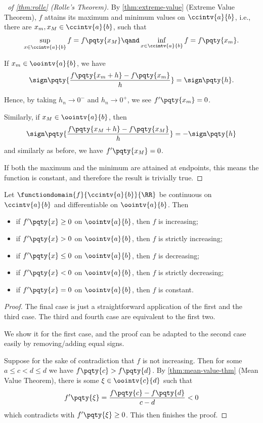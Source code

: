 \begin{proof}[\proofname\ of \autoref{thm:rolle} (Rolle's Theorem)]
    By \autoref{thm:extreme-value} (Extreme Value Theorem), \(f\) attains its maximum and minimum values on \(\ccintv{a}{b}\), i.e., there are \(x_m, x_M \in \ccintv{a}{b}\), such that
    \[
        \sup_{x \in \ccintv{a}{b}} f = f\pqty{x_M} \qand \inf_{x \in \ccintv{a}{b}} f = f\pqty{x_m}.
    \]

    If \(x_m \in \oointv{a}{b}\), we have
    \[
        \sign \pqty{\frac{f\pqty{x_m + h} - f\pqty{x_m}}{{h}}} = \sign \pqty{h}.
    \]

    Hence, by taking \(h_n \to 0^-\) and \(h_n \to 0^+\), we see \(f'\pqty{x_m} = 0\).

    Similarly, if \(x_M \in \oointv{a}{b}\), then
    \[
        \sign \pqty{\frac{f\pqty{x_M + h} - f\pqty{x_M}}{h}} = - \sign\pqty{h}
    \]
    and similarly as before, we have \(f'\pqty{x_M} = 0\).

    If both the maximum and the minimum are attained at endpoints, this means the function is constant, and therefore the result is trivially true.
\end{proof}

\begin{corollary}
    \label{cor:sign-of-derivative-monotonicity}%
    Let \(\functiondomain{f}{\ccintv{a}{b}}{\RR}\) be continuous on \(\ccintv{a}{b}\) and differentiable on \(\oointv{a}{b}\). Then
    \begin{itemize}
        \item if \(f'\pqty{x} \geq 0\) on \(\oointv{a}{b}\), then \(f\) is increasing;
        \item if \(f'\pqty{x} > 0\) on \(\oointv{a}{b}\), then \(f\) is strictly increasing;
        \item if \(f'\pqty{x} \leq 0\) on \(\oointv{a}{b}\), then \(f\) is decreasing;
        \item if \(f'\pqty{x} < 0\) on \(\oointv{a}{b}\), then \(f\) is strictly decreasing;
        \item if \(f'\pqty{x} = 0\) on \(\oointv{a}{b}\), then \(f\) is constant.
    \end{itemize}
\end{corollary}

\begin{proof}
    The final case is just a straightforward application of the first and the third case. The third and fourth case are equivalent to the first two.

    We show it for the first case, and the proof can be adapted to the second case easily by removing/adding equal signs.

    Suppose for the sake of contradiction that \(f\) is not increasing. Then for some \(a \leq c < d \leq d\) we have \(f\pqty{c} > f\pqty{d}\). By \autoref{thm:mean-value-thm} (Mean Value Theorem), there is some \(\xi \in \oointv{c}{d}\) such that
    \[
        f'\pqty{\xi} = \frac{f\pqty{c} - f\pqty{d}}{c - d} < 0
    \]
    which contradicts with \(f'\pqty{\xi} \geq 0\). This then finishes the proof.
\end{proof}

